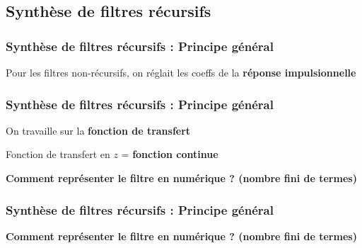 \documentclass{beamer}
\begin{document}
\subsection{Synthèse de filtres récursifs}


\begin{frame}
\frametitle{Synthèse de filtres récursifs : Principe général}
Pour les filtres non-récursifs, on réglait les coeffs de la \textbf{réponse impulsionnelle}\\

\vspace{1 cm}
\vspace{1 cm}

\end{frame}

\begin{frame}
\frametitle{Synthèse de filtres récursifs : Principe général}

\begin{block}{}
On travaille sur la \textbf{fonction de transfert} 
\end{block}

\vspace{1cm} 

Fonction de transfert en $z$ = \textbf{fonction continue }\\

\vspace{1cm}

\textbf{Comment représenter le filtre en numérique ? (nombre fini de termes)}


\end{frame}

\begin{frame}
\frametitle{Synthèse de filtres récursifs : Principe général}
\textbf{Comment représenter le filtre en numérique ? (nombre fini de termes)}\\
\vspace{1cm}
\vspace{1cm} 




\end{frame}
\end{document}

